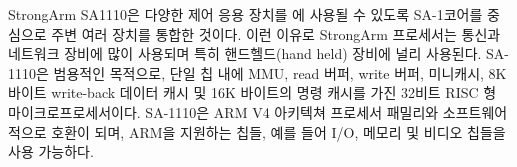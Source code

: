 StrongArm SA1110은 다양한 제어 응용 장치를 에 사용될 수 있도록 SA-1코어를 중심으로 주변 여러 장치를 통합한 것이다. 이런 이유로 StrongArm 프로세서는 통신과 네트워크 장비에 많이 사용되며 특히 핸드헬드(hand held) 장비에 널리 사용된다. SA- 1110은 범용적인 목적으로, 단일 칩 내에 MMU, read 버퍼, write 버퍼, 미니캐시, 8K 바이트 write-back 데이터 캐시 및 16K 바이트의 명령 캐시를 가진 32비트 RISC 형 마이크로프로세서이다. SA-1110은 ARM V4 아키텍쳐 프로세서 패밀리와 소프트웨어적으로 호환이 되며, ARM을 지원하는 칩들, 예를 들어 I/O, 메모리 및 비디오 칩들을 사용 가능하다. \cite{Intel:2000}